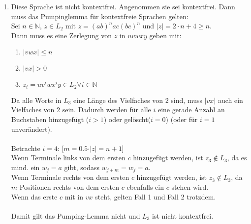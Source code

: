 \documentclass[11pt]{article}
\begin{document}
\begin{enumerate}[label=\arabic*)]
\item
Diese Sprache ist nicht kontextfrei.
Angenommen sie sei kontextfrei. Dann muss das Pumpinglemma für kontextfreie Sprachen gelten:
\\Sei $n\in\mathbb{N}$, $z\in L_2$ mit $z=(ab)^nac(bc)^n$ und $\vert z \vert = 2\cdot n + 4 \geq n$.
\\Dann muss es eine Zerlegung von $z$ in $uvwxy$ geben mit:
\begin{enumerate}[label=(\arabic*)]
\item $\vert vwx \vert \leq n$
\item $\vert vx \vert > 0$
\item $z_i=uv^iwx^iy\in L_2 \forall i\in\mathbb{N}$
\end{enumerate}
Da alle Worte in $L_3$ eine Länge des Vielfaches von 2 sind, muss $\vert vx \vert$ auch ein Vielfaches von 2 sein. Dadurch werden für alle $i$ eine gerade Anzahl an Buchstaben hinzugefügt ($i>1$) oder gelöscht($i=0$) (oder für $i=1$ unverändert).
\\\\Betrachte $i=4$: [$m=0.5\cdot\vert z \vert = n+1$]
\\Wenn Terminale links von dem ersten $c$ hinzugefügt werden, ist $z_3 \not\in L_3$, da es mind. ein $w_j=a$ gibt, sodass $w_{j+m}=w_j=a$.
\\Wenn Terminale rechts von dem ersten $c$ hinzugefügt werden, ist $z_3 \not\in L_3$, da $m$-Positionen rechts von dem ersten $c$ ebenfalls ein $c$ stehen wird.
\\Wenn das erste $c$ mit in $vx$ steht, gelten Fall 1 und Fall 2 trotzdem.
\\\\Damit gilt das Pumping-Lemma nicht und $L_3$ ist nicht kontextfrei.

\end{enumerate}
\end{document}
